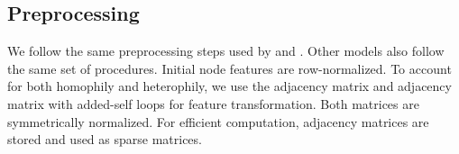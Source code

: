 \documentclass[sigconf,natbib=false]{acmart}
\begin{document}
\subsection{Preprocessing}

We follow the same preprocessing steps used by \cite{pei_geom-gcn_2020} and \cite{chen_simple_2020}. Other models also follow the same set of procedures. Initial node features are row-normalized. To account for both homophily and heterophily, we use the adjacency matrix and adjacency matrix with added-self loops for feature transformation. Both matrices are symmetrically normalized. For efficient computation, adjacency matrices are stored and used as sparse matrices.
\end{document}
